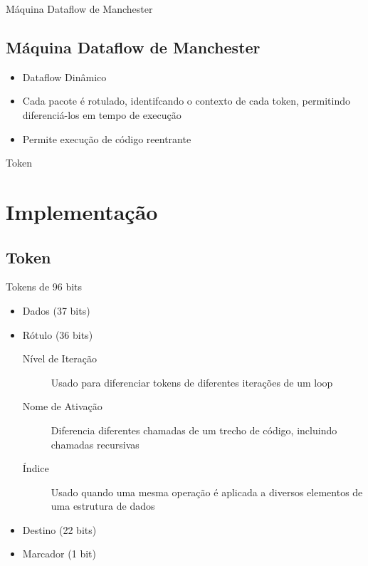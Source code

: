 \documentclass{beamer}
\begin{document}
\begin{frame}{Máquina Dataflow de Manchester}
	\subsection{Máquina Dataflow de Manchester}
	\begin{itemize}
		\item Dataflow Dinâmico
		\item Cada pacote é rotulado, identifcando o contexto de cada token, permitindo diferenciá-los em tempo de execução
		\item Permite execução de código reentrante
	\end{itemize}
\end{frame}

\begin{frame}{Token}
	\section{Implementação}
	\subsection{Token}
	
	Tokens de 96 bits
		\begin{itemize}
			\item Dados (37 bits)
			\item Rótulo (36 bits)
			\begin{description}
				\item[Nível de Iteração] Usado para diferenciar tokens de diferentes iterações de um loop
				\item[Nome de Ativação] Diferencia diferentes chamadas de um trecho de código, incluindo chamadas recursivas
				\item[Índice] Usado quando uma mesma operação é aplicada a diversos elementos de uma estrutura de dados
			\end{description}
			\item Destino (22 bits)
			\item Marcador (1 bit)
		\end{itemize}
\end{frame}
\end{document}
